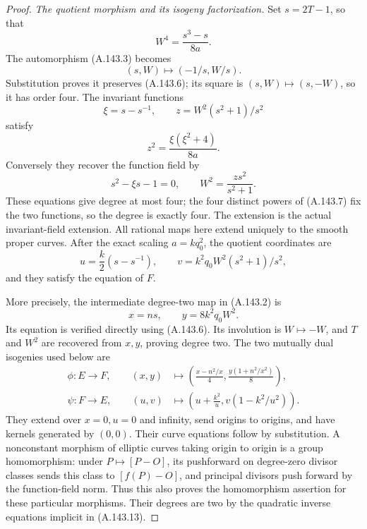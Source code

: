 \begin{proof}
\emph{The quotient morphism and its isogeny factorization.}
Set \(s=2T-1\), so that
\[
                         W^4=\frac{s^3-s}{8a}.
\tag{A.143.6}
\]
The automorphism (A.143.3) becomes
\[
                         (s,W)\longmapsto(-1/s,W/s).
\tag{A.143.7}
\]
Substitution proves it preserves (A.143.6); its square is
\((s,W)\mapsto(s,-W)\), so it has order four.
The invariant functions
\[
                    \xi=s-s^{-1},\qquad
                    z=W^2(s^2+1)/s^2
\tag{A.143.8}
\]
satisfy
\[
                         z^2=\frac{\xi(\xi^2+4)}{8a}.
\tag{A.143.9}
\]
Conversely they recover the function field by
\[
                     s^2-\xi s-1=0,\qquad
                     W^2=\frac{zs^2}{s^2+1}.
\tag{A.143.10}
\]
These equations give degree at most four; the four distinct powers
of (A.143.7) fix the two functions, so the degree is exactly four.
The extension is the actual invariant-field extension.
All rational maps here extend uniquely to the smooth proper curves.
After the exact scaling \(a=kq_0^2\), the quotient coordinates are
\[
                    u=\frac{k}{2}(s-s^{-1}),\qquad
                    v=k^2q_0 W^2(s^2+1)/s^2,
\tag{A.143.11}
\]
and they satisfy the equation of \(F\).

More precisely, the intermediate degree-two map in (A.143.2) is
\[
                         x=ns,\qquad
                         y=8k^2q_0W^2 .
\tag{A.143.12}
\]
Its equation is verified directly using (A.143.6).
Its involution is \(W\mapsto-W\), and \(T\) and \(W^2\) are
recovered from \(x,y\), proving degree two.
The two mutually dual isogenies used below are
\[
 \begin{aligned}
 \phi:E\longrightarrow F,\qquad
  (x,y)&\longmapsto
    \left(\frac{x-n^2/x}{4},
           \frac{y(1+n^2/x^2)}8\right),\\
 \psi:F\longrightarrow E,\qquad
  (u,v)&\longmapsto
    \left(u+\frac{k^2}{u},
           v(1-k^2/u^2)\right).
 \end{aligned}
\tag{A.143.13}
\]
They extend over \(x=0,u=0\) and infinity, send origins to
origins, and have kernels generated by \((0,0)\).
Their curve equations follow by substitution.
A nonconstant morphism of elliptic curves taking origin to origin
is a group homomorphism: under
\(P\mapsto[P-O]\), its pushforward on degree-zero divisor classes
sends this class to \([f(P)-O]\), and principal divisors push
forward by the function-field norm.
Thus this also proves the homomorphism assertion for these
particular morphisms.
Their degrees are two by the quadratic inverse equations implicit
in (A.143.13).


\end{proof}
